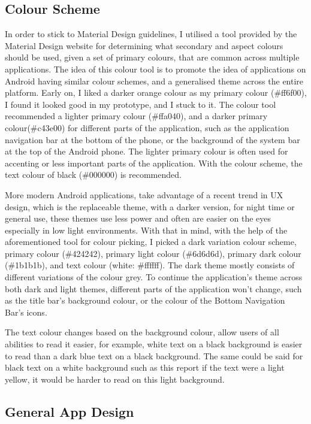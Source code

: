 \subsection{Colour Scheme} \label{COLOURSCHEME}
In order to stick to Material Design guidelines, I utilised a tool provided by the Material Design website\cite{MATERIALDESIGNCOLOURS} for determining what secondary and aspect colours should be used, given a set of primary colours, that are common across multiple applications. The idea of this colour tool is to promote the idea of applications on Android having similar colour schemes, and a generalised theme across the entire platform. Early on, I liked a darker orange colour as my primary colour (\#ff6f00), I found it looked good in my prototype, and I stuck to it. The colour tool recommended a lighter primary colour (\#ffa040), and a darker primary colour(\#c43e00) for different parts of the application, such as the application navigation bar at the bottom of the phone, or the background of the system bar at the top of the Android phone. The lighter primary colour is often used for accenting or less important parts of the application. With the colour scheme, the text colour of black (\#000000) is recommended.

More modern Android applications, take advantage of a recent trend in UX design, which is the replaceable theme, with a darker version, for night time or general use, these themes use less power and often are easier on the eyes especially in low light environments. With that in mind, with the help of the aforementioned tool for colour picking\cite{MATERIALDESIGNCOLOURS}, I picked a dark variation colour scheme, primary colour (\#424242), primary light colour (\#6d6d6d), primary dark colour (\#1b1b1b), and text colour (white: \#ffffff). The dark theme mostly consists of different variations of the colour grey. To continue the application's theme across both dark and light themes, different parts of the application won't change, such as the title bar's background colour, or the colour of the \gls{Bottom Navigation Bar}'s icons.

The text colour changes based on the background colour, allow users of all abilities to read it easier, for example, white text on a black background is easier to read than a dark blue text on a black background. The same could be said for black text on a white background such as this report if the text were a light yellow, it would be harder to read on this light background.

\subsection{General App Design}


